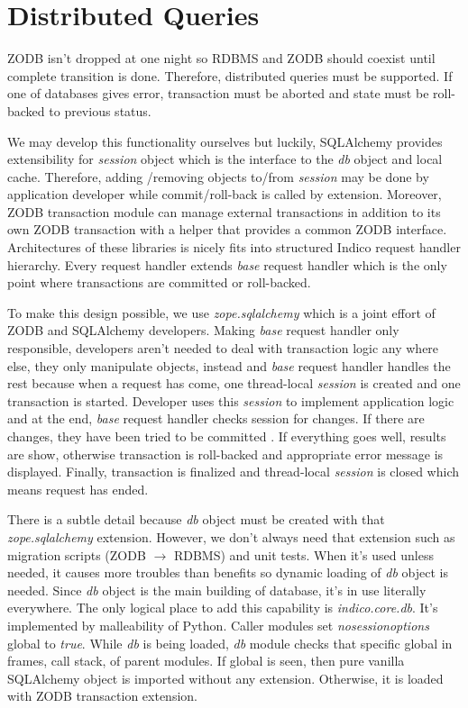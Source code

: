 \section{Distributed Queries}

ZODB isn't dropped at one night so RDBMS and ZODB should coexist until complete transition is done. Therefore, distributed queries must be supported. If one of databases gives error, transaction must be aborted and state must be roll-backed to previous status.

We may develop this functionality ourselves but luckily, SQLAlchemy provides extensibility for \textit{session} object which is the interface to the \textit{db} object and local cache. Therefore, adding /removing objects to/from \textit{session} may be done by application developer while commit/roll-back is called by extension. Moreover, ZODB transaction module can manage external transactions in addition to its own ZODB transaction with a helper that provides a common ZODB interface. Architectures of these libraries is nicely fits into structured Indico request handler hierarchy. Every request handler extends \textit{base} request handler which is the only point where transactions are committed or roll-backed.

To make this design possible, we use \textit{zope.sqlalchemy} which is a joint effort of ZODB and SQLAlchemy developers. Making \textit{base} request handler only responsible, developers aren't needed to deal with transaction logic any where else, they only manipulate objects, instead and \textit{base} request handler handles the rest because when a request has come, one thread-local \textit{session} is created and one transaction is started. Developer uses this \textit{session} to implement application logic and at the end, \textit{base} request handler checks session for changes. If there are changes, they have been tried to be committed  . If everything goes well, results are show, otherwise transaction is roll-backed and appropriate error message is displayed. Finally, transaction is finalized and  thread-local \textit{session} is closed which means request has ended.

There is a subtle detail because \textit{db} object must be created with that \textit{zope.sqlalchemy} extension. However, we don't always need that extension such as migration scripts (ZODB $\rightarrow$ RDBMS) and unit tests. When it's used unless needed, it causes more troubles than benefits so dynamic loading of \textit{db} object is needed. Since \textit{db} object is the main building of database, it's in use literally everywhere. The only logical place to add this capability is \textit{indico.core.db}. It's implemented by malleability of Python. Caller modules set \textunderscore \textunderscore \textit{no}\textunderscore \textit{session}\textunderscore \textit{options}\textunderscore\textunderscore\textit{ }global to \textit{true}. While \textit{db} is being loaded, \textit{db} module checks that specific global in frames, call stack, of parent modules. If global is seen, then pure vanilla SQLAlchemy object is imported without any extension. Otherwise, it is loaded with ZODB transaction extension.


